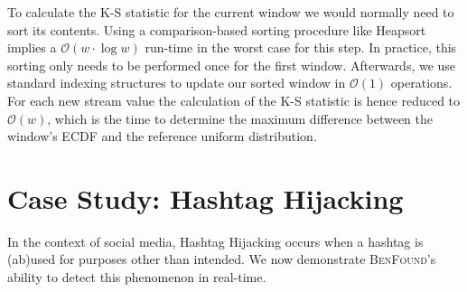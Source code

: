 \documentclass[twoside,leqno,twocolumn]{article}\usepackage[]{graphicx}\usepackage[]{color}
\newcommand{\algoname}{\textsc{BenFound}}
\begin{document}
To calculate the K-S statistic for the current window we would normally need to sort its contents. Using a comparison-based sorting procedure like Heapsort implies a $\mathcal{O}(w \cdot \log w)$ run-time in the worst case for this step. In practice, this sorting only needs to be performed once for the first window. Afterwards, we use standard indexing structures to update our sorted window in $\mathcal{O}(1)$ operations. For each new stream value the calculation of the K-S statistic is hence reduced to $\mathcal{O}(w)$, which is the time to determine the maximum difference between the window's ECDF and the reference uniform distribution.


\section{Case Study: Hashtag Hijacking}
\label{sec:case-study:-twitter}

In the context of social media, Hashtag Hijacking occurs when a hashtag is (ab)used for purposes other than intended. We now demonstrate \algoname{}'s ability to detect this phenomenon in real-time.
\end{document}
